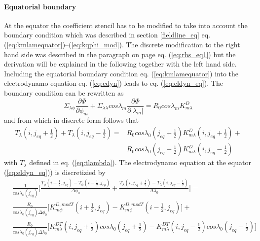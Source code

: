\paragraph{Equatorial boundary}\label{finite_equator}
%
At the equator the coefficient stencil has to be modified to
take into account the boundary condition which was described 
in section \ref{fieldline_eq} eq. (\ref{eq:kmlamequator})--(\ref{eq:kqphi_mod}). 
The discrete modification to the right hand side was described in the
paragraph on page \pageref{page:finite_rhs} eq. (\ref{eq:rhs_eq1}) 
but the derivation will be explained in the
following together with the left hand side. \\
%
Including the
equatorial boundary condition eq. (\ref{eq:kmlamequator}) into the electrodynamo equation 
eq. (\ref{eq:edyn}) leads to eq. (\ref{eq:eldyn_eq}). The boundary condition can be rewritten
as
%
\begin{equation}
   \Sigma_{\lambda \phi}
    \frac{\partial \Phi}{\partial \phi_m} + 
   \Sigma_{\lambda \lambda} cos \lambda_m 
   \frac{\partial \Phi}{\partial |\lambda_m|} =  R_0 cos \lambda_m K_{m \lambda}^D
\end{equation}
%
and from which in discrete form follows that
%
\begin{equation}
 \begin{split}
   T_{\lambda}(i,j_{eq}+\frac{1}{2})+ T_{\lambda}(i,j_{eq}-\frac{1}{2}) 
   = & R_0 cos \lambda_0(j_{eq}+\frac{1}{2}) K_{m \lambda}^D(i,j_{eq}+\frac{1}{2}) + \\
     & R_0 cos \lambda_0(j_{eq}-\frac{1}{2}) K_{m \lambda}^D(i,j_{eq}-\frac{1}{2}) \label{eq:finite_eqbnd1}
 \end{split}
\end{equation}
%
with $T_{\lambda}$ defined in eq. (\ref{eq:tlambda}).
The electrodynamo equation at the equator (\ref{eq:eldyn_eq})) is discretizied by
%
\begin{equation}
   \begin{split}
    & \frac{1}{cos \lambda_0(j_{eq})} \biggl[ \frac{T_{\phi}(i+\frac{1}{2},j_{eq})-
     T_{\phi}(i-\frac{1}{2},j_{eq})}{\Delta \phi_0} + \frac{T_{\lambda}(i,j_{eq}+\frac{1}{2})-
     T_{\lambda}(i,j_{eq}-\frac{1}{2})}{\Delta \lambda_0} \biggr] = \\
   &  \frac{R_0}{cos \lambda_0 (j_{eq}) \Delta \phi_0} \biggl[  K_{m \phi}^{D, mod T}(i+\frac{1}{2},j_{eq}) - 
      K_{m \phi}^{D, mod T}(i-\frac{1}{2},j_{eq})
     \biggr] 
     + \\
   & \frac{R_0}{cos \lambda_0 (j_{eq}) \Delta \lambda_0}\biggl[K_{m \lambda }^{DT}(i,j_{eq}+\frac{1}{2}) 
    cos \lambda_0(j_{eq}+\frac{1}{2}) - K_{m \lambda }^{DT}(i,j_{eq}-\frac{1}{2}) 
    cos \lambda_0(j_{eq}-\frac{1}{2})   \biggr]\label{eq:finite_eqbnd2}
   \end{split}
\end{equation}
